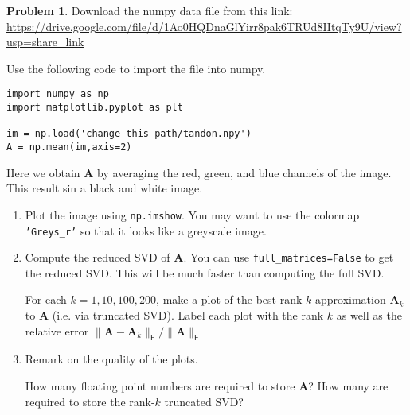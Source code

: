 \documentclass[12pt]{article}
\theoremstyle{definition}
\newtheorem{problem}{Problem}
\renewcommand{\vec}{\mathbf}
\newcommand{\F}{\mathsf{F}}
\begin{document}
\begin{problem}

    Download the numpy data file from this link:  \url{https://drive.google.com/file/d/1Ao0HQDnaGlYirr8pak6TRUd8IItqTy9U/view?usp=share_link}

Use the following code to import the file into numpy.

\begin{lstlisting}
import numpy as np
import matplotlib.pyplot as plt

im = np.load('change this path/tandon.npy')
A = np.mean(im,axis=2)
\end{lstlisting}

Here we obtain $\vec{A}$ by averaging the red, green, and blue channels of the image.
This result sin a black and white image.

    \begin{enumerate}
        \item Plot the image using \lstinline{np.imshow}.
            You may want to use the colormap \texttt{'Greys\_r'} so that it looks like a greyscale image.
        \item
            Compute the reduced SVD of $\vec{A}$. 
            You can use \lstinline{full_matrices=False} to get the reduced SVD.
            This will be much faster than computing the full SVD.

            For each $k=1,10,100,200$, make a plot of the best rank-$k$ approximation $\vec{A}_k$ to $\vec{A}$ (i.e. via truncated SVD).
            Label each plot with the rank $k$ as well as the relative error $\| \vec{A} - \vec{A}_k \|_\F / \| \vec{A} \|_\F$
        \item 
            Remark on the quality of the plots. 
            
            How many floating point numbers are required to store $\vec{A}$?
            How many are required to store the rank-$k$ truncated SVD?
    \end{enumerate}

\end{problem}
\clearpage
\end{document}

